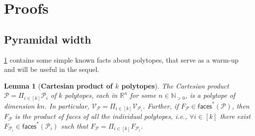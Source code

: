 \documentclass{article}
\newcommand{\R}{\mathbb{R}}
\newcommand{\mP}{\mathcal{P}}
\newcommand{\verts}[1]{\mathcal{V}_{#1}}
\newcommand{\faces}[1]{{\mathsf{faces}^\ast}\left(#1\right)}
\newtheorem{lemma}[theorem]{Lemma}
\begin{document}
\section{Proofs}\label{a:proofs}
%
%
%
%
%
%
%
%
%
%
\subsection{Pyramidal width}\label{a:pw}

\cref{fact:cart_prod_kpolytopes} contains some simple known facts about polytopes, that serve as a warm-up and will be useful in the sequel.

\begin{lemma}[\textbf{Cartesian product of $k$ polytopes}]\label{fact:cart_prod_kpolytopes}
The Cartesian product $\mP = \Pi_{i \in [k]} \mP_i$ of $k$ polytopes, each in $\R^n$ for some $n \in \mathbb{N}_{>0}$, is a polytope of dimension $kn$.
In particular, $\verts{\mP} = \Pi_{i \in [k]}\verts{\mP_i}$.
Further, if $F_\mP \in \faces{\mP}$, then  $F_\mP$ is the product of faces of all the individual polytopes, i.e., $\forall i \in [k]$ there exist $F_{\mP_i} \in \faces{\mP_i}$ such that $F_\mP = \Pi_{i \in [k]} F_{\mP_i}$.
\end{lemma}
\end{document}
